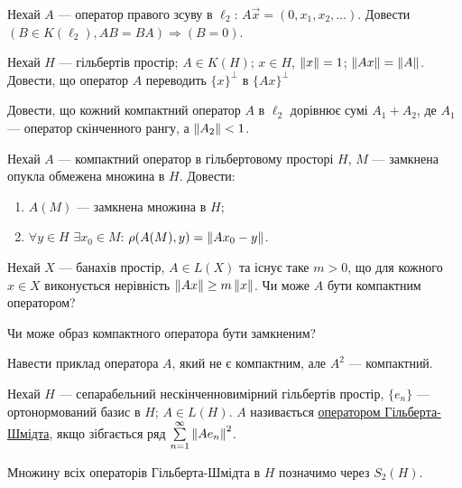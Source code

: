 \begin{exercise}
    Нехай $A$ --- оператор правого зсуву в $\ell_2$: $A\vec{x} = (0,x_1,x_2,\dots)$.
    Довести $(B \in K(\ell_2), AB=BA) \Rightarrow (B=0)$.
\end{exercise}

\begin{exercise}\label{N:1_5_33}
    Нехай $H$ --- гільбертів простір; $A \in K(H)$; $x \in H$, $\left\lVert x\right\rVert = 1$;
    $\left\lVert Ax\right\rVert = \left\lVert A\right\rVert$. Довести, що оператор $A$ переводить $\{x\}^\perp$
    в $\{Ax\}^\perp$
\end{exercise}

\begin{exercise}
    Довести, що кожний компактний оператор $A$ в $\ell_2$ дорівнює сумі $A_1 + A_2$,
    де $A_1$ --- оператор скінченного рангу, а $\left\lVert A_2\right\rVert<1$.
\end{exercise}

\begin{exercise}
    Нехай $A$ --- компактний оператор в гільбертовому просторі $H$, $M$ ---
    замкнена опукла обмежена множина в $H$. Довести:
    \begin{enumerate}
        \item $A(M)$ --- замкнена множина в $H$;
        \item $\forall y \in H$ $\exists x_0 \in M$: $\rho(A(M),y) = \left\lVert Ax_0 - y\right\rVert$.
    \end{enumerate}
\end{exercise}

\begin{exercise}
    Нехай $X$ --- банахів простір, $A \in L(X)$ та існує таке $m>0$, що для кожного
    $x \in X$ виконується нерівність $\left\lVert Ax\right\rVert \geq m \left\lVert x\right\rVert$. Чи може $A$ бути
    компактним оператором?
\end{exercise}

\begin{exercise}
    Чи може образ компактного оператора бути замкненим?
\end{exercise}

\begin{exercise}
    Навести приклад оператора $A$, який не є компактним, але $A^2$ --- компактний.
\end{exercise}

\begin{theory}
    Нехай $H$ --- сепарабельний нескінченновимірний гільбертів простір, $\{e_n\}$ ---
    ортонормований базис в $H$; $A \in L(H)$. $A$ називається \ul{оператором
    Гільберта-Шмідта}, якщо зібгається ряд $\sum\limits^\infty_{n=1} \left\lVert A e_n\right\rVert^2$.

    Множину всіх операторів Гільберта-Шмідта в $H$ позначимо через $S_2(H)$. 
\end{theory}